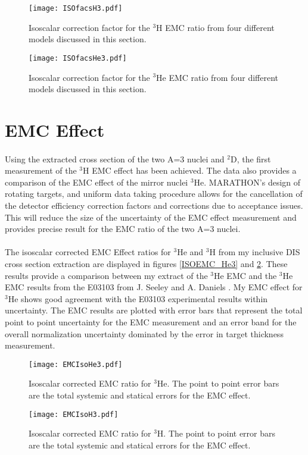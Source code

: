 	\begin{figure}[h]
		\texttt{[image: ISOfacsH3.pdf]}
		\caption{Isoscalar correction factor for the $^3$H EMC ratio from four different models discussed in this section.}
		\label{isofuncs}
		\vspace{1cm}
		\texttt{[image: ISOfacsHe3.pdf]}
		\caption{Isoscalar correction factor for the $^3$He EMC ratio from four different models discussed in this section.}
		\label{isofuncsHe3}
	\end{figure}

\section{EMC Effect}
\paragraph{} Using the extracted cross section of the two A=3 nuclei and $^2$D, the first measurement of the $^3$H EMC effect has been achieved. The data also provides a comparison of the EMC effect of the mirror nuclei $^3$He. MARATHON's design of rotating targets, and uniform data taking procedure allows for the cancellation of the detector efficiency correction factors and corrections due to acceptance issues. This will reduce the size of the uncertainty of the EMC effect measurement and provides precise result for the EMC ratio of the two A=3 nuclei. 
\paragraph{}The isoscalar corrected EMC Effect ratios for $^3$He and $^3$H from my inclusive DIS cross section extraction are displayed in figures \ref{ISOEMC_He3} and \ref{ISOEMC_H3}. These results provide a comparison between my extract of the $^3$He EMC and the $^3$He EMC results from the E03103 from J. Seeley and A. Daniels \cite{seeley}. My EMC effect for $^3$He shows good agreement with the E03103 experimental results within uncertainty. The EMC results are plotted with error bars that represent the total point to point uncertainty for the EMC measurement and an error band for the overall normalization uncertainty dominated by the error in target thickness measurement.  
	\begin{figure}
		\texttt{[image: EMCIsoHe3.pdf]}
		\caption{Isoscalar corrected EMC ratio for $^3$He. The point to point error bars are the total systemic and statical errors for the EMC effect.}
		\label{ISOEMC_He3}
	\vspace{1cm}
	\texttt{[image: EMCIsoH3.pdf]}
	\caption{Isoscalar corrected EMC ratio for $^3$H. The point to point error bars are the total systemic and statical errors for the EMC effect.}
	\label{ISOEMC_H3}
\end{figure}

